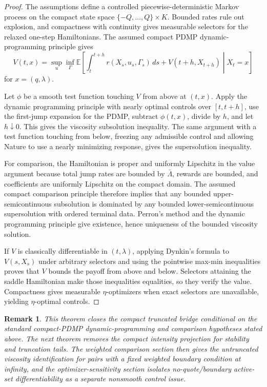 \documentclass[11pt]{article}
\newtheorem{remark}{Remark}
\newcommand{\E}{\mathbb{E}}
\begin{document}
\begin{proof}
The assumptions define a controlled piecewise-deterministic Markov process on
the compact state space
$\{-Q,\ldots,Q\}\times K$. Bounded rates rule out explosion, and compactness
with continuity gives measurable selectors for the relaxed one-step
Hamiltonians. The assumed compact PDMP dynamic-programming principle gives
\[
V(t,x)=
\sup_u\inf_\Gamma
\E\left[
\int_t^{t+h} r(X_s,u_s,\Gamma_s)\,ds+
V(t+h,X_{t+h})\middle|X_t=x
\right]
\]
for $x=(q,\lambda)$.

Let $\phi$ be a smooth test function touching $V$ from above at
$(t,x)$. Apply the dynamic programming principle with nearly optimal controls
over $[t,t+h]$, use the first-jump expansion for the PDMP, subtract
$\phi(t,x)$, divide by $h$, and let $h\downarrow0$. This gives the viscosity
subsolution inequality. The same argument with a test function touching from
below, freezing any admissible control and allowing Nature to use a nearly
minimizing response, gives the supersolution inequality.

For comparison, the Hamiltonian is proper and uniformly Lipschitz in the value
argument because total jump rates are bounded by $\bar\Lambda$, rewards are
bounded, and coefficients are uniformly Lipschitz on the compact domain. The
assumed compact comparison principle therefore implies that any bounded
upper-semicontinuous subsolution is dominated by any bounded
lower-semicontinuous supersolution with ordered terminal data. Perron's method
and the dynamic programming principle give existence, hence uniqueness of the
bounded viscosity solution.

If $V$ is classically differentiable in $(t,\lambda)$, applying Dynkin's
formula to $V(s,X_s)$ under arbitrary selectors and using the pointwise
max-min inequalities proves that $V$ bounds the payoff from above and below.
Selectors attaining the saddle Hamiltonian make those inequalities equalities,
so they verify the value. Compactness gives measurable $\eta$-optimizers when
exact selectors are unavailable, yielding $\eta$-optimal controls.
\end{proof}

\begin{remark}
This theorem closes the compact truncated bridge conditional on the standard
compact-PDMP dynamic-programming and comparison hypotheses stated above. The
next theorem removes the compact intensity projection for stability and
truncation tails. The weighted comparison section then gives the untruncated
viscosity identification for pairs with a fixed weighted boundary condition at
infinity, and the optimizer-sensitivity section isolates no-quote/boundary
active-set differentiability as a separate nonsmooth control issue.
\end{remark}
\end{document}
